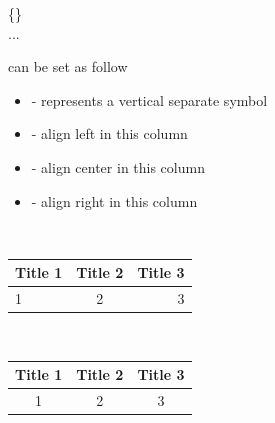 \begin{frame}
	\begin{command}
		\{\}\\
		\qquad ...\\
	\end{command}
	 can be set as follow
	\begin{itemize}
		\item \structure{|} - represents a vertical separate symbol
		\item {} - align left in this column
		\item {} - align center in this column
		\item {} - align right in this column
	\end{itemize}
	\begin{example}
		\begin{minipage}{0.48\linewidth}
			\centering
			\\[0.5em]
        	\begin{tabular}{|l|c|r|}
        		\hline
        		Title 1 & Title 2 & Title 3 \\
        		\hline
        		1 & 2 &3 \\
        		\hline
        	\end{tabular}
		\end{minipage}
		\begin{minipage}{0.48\linewidth}
			\centering
			\\[0.5em]
        	\begin{tabular}{||c|cc||}
        		\hline
        		Title 1 & Title 2 & Title 3 \\
        		\hline
        		1 & 2 &3 \\
        		\hline
        	\end{tabular}
		\end{minipage}
    \end{example}	
\end{frame}

